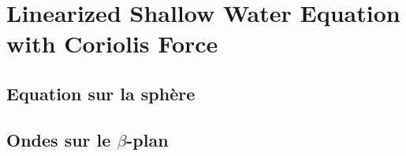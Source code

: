 \chapter{Linearized Shallow Water Equation with Coriolis Force}

\section{Equation sur la sphère}

\section{Ondes sur le $\beta$-plan}

